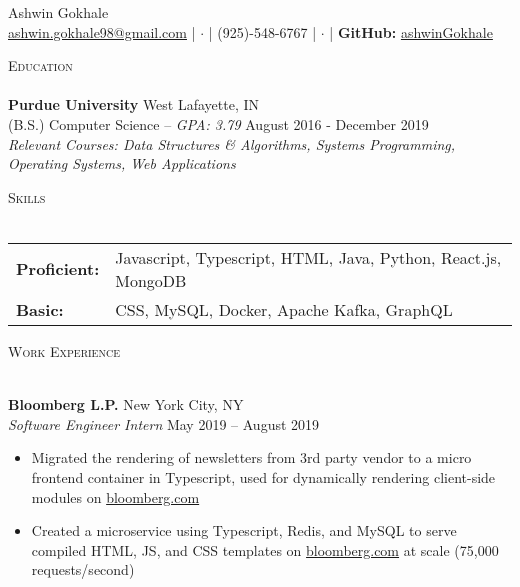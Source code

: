 \documentclass[letterpaper, 10pt]{article}
\newcommand{\lineunder} {
    \vspace*{-8pt} \\
    \hspace*{-18pt} \hrulefill \\
}
\newcommand{\header} [1] {
    {
        \hspace*{-18pt}\vspace*{6pt}
        {\large\textsc{#1}}
    }
    \vspace*{-6pt} \lineunder
}
\newcommand{\contact} [2] {
    \vspace*{-10pt}
    \begin{center}
        {\Huge#1}
        \vspace*{5pt}
        \\ 
        #2
    \end{center}
    \vspace*{-10pt}
}
\begin{document}
\vspace*{20pt}

\vspace*{-10pt}
\contact{Ashwin Gokhale}
{
    \href{mailto:ashwin.gokhale98@gmail.com}{ashwin.gokhale98@gmail.com} |
    $\cdot$ | (925)-548-6767 | $\cdot$ |
    \textbf{GitHub:}
    \href{https://goo.gl/R79aeK}{ashwinGokhale}
}

\vspace{10pt}

\header{Education}
\textbf{Purdue University}
\hfill West Lafayette, IN\\
(B.S.) Computer Science -- \textit{GPA: 3.79}
\hfill August 2016 - December 2019
\\

\textit{Relevant Courses: Data Structures \& Algorithms, Systems Programming, Operating Systems, Web Applications}

\vspace{2mm}

\vspace{1mm}
\header{Skills}
\vspace{1mm}
\begin{tabular}{ l l }
    \textbf{Proficient:} & Javascript, Typescript, HTML, Java, Python, React.js, MongoDB \\
    \textbf{Basic:}      & CSS, MySQL, Docker, Apache Kafka, GraphQL                     \\
\end{tabular}
\vspace{2mm}

\header{Work Experience}
\vspace{1mm}

\textbf{Bloomberg L.P.} \hfill New York City, NY\\
\textit{Software Engineer Intern} \hfill May 2019 -- August 2019\\
\vspace{-1mm}
\begin{itemize} \itemsep 1pt
    \item Migrated the rendering of newsletters from 3rd party vendor to a micro frontend container in Typescript, used for dynamically rendering client-side modules on \href{https://www.bloomberg.com}{bloomberg.com}
    \item Created a microservice using Typescript, Redis, and MySQL to serve compiled HTML, JS, and CSS templates on \href{https://www.bloomberg.com}{bloomberg.com} at scale (75,000 requests/second)
\end{itemize}
\end{document}
